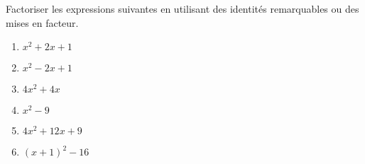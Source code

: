 
\begin{exercice}\label{exosmath-0047}

    Factoriser les expressions suivantes en utilisant des identités remarquables ou des mises en facteur.
    \begin{multicols}{3}
        \begin{enumerate}
            \item
                \( x^2+2x+1\)
            \item
                \( x^2-2x+1\)
            \item
                \( 4x^2+4x\)
            \item
                \( x^2-9\)
            \item
                \( 4x^2+12x+9\)
            \item
                \( (x+1)^2-16\)
        \end{enumerate}
    \end{multicols}

\end{exercice}
